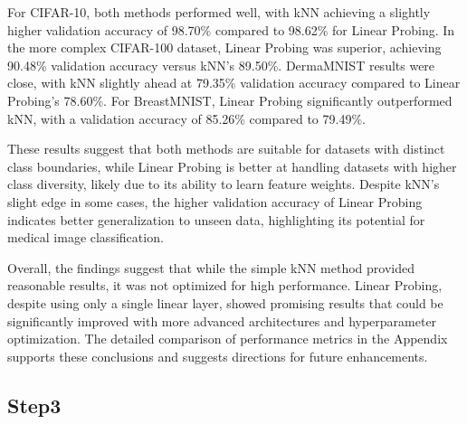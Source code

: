 \documentclass[a4paper]{article}
\begin{document}
For CIFAR-10, both methods performed well, with kNN achieving a slightly higher validation accuracy of 98.70\% compared to 98.62\% for Linear Probing. In the more complex CIFAR-100 dataset, Linear Probing was superior, achieving 90.48\% validation accuracy versus kNN’s 89.50\%. DermaMNIST results were close, with kNN slightly ahead at 79.35\% validation accuracy compared to Linear Probing’s 78.60\%. For BreastMNIST, Linear Probing significantly outperformed kNN, with a validation accuracy of 85.26\% compared to 79.49\%.

These results suggest that both methods are suitable for datasets with distinct class boundaries, while Linear Probing is better at handling datasets with higher class diversity, likely due to its ability to learn feature weights. Despite kNN's slight edge in some cases, the higher validation accuracy of Linear Probing indicates better generalization to unseen data, highlighting its potential for medical image classification.

Overall, the findings suggest that while the simple kNN method provided reasonable results, it was not optimized for high performance. Linear Probing, despite using only a single linear layer, showed promising results that could be significantly improved with more advanced architectures and hyperparameter optimization. The detailed comparison of performance metrics in the Appendix supports these conclusions and suggests directions for future enhancements.



\subsection{Step3}
\end{document}
